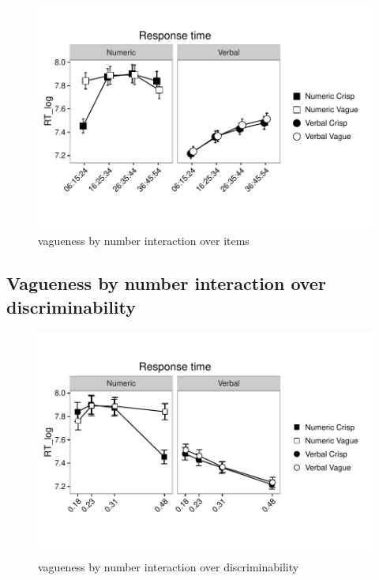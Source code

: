 \documentclass[a4paper,12pt,twoside]{article}\usepackage[]{graphicx}\usepackage[]{color}
\makeatletter
\def\maxwidth{ %
  \ifdim\Gin@nat@width>\linewidth
    \linewidth
  \else
    \Gin@nat@width
  \fi
}
\newenvironment{knitrout}{}{} %
\makeatother
\begin{document}
\begin{knitrout}\scriptsize
{}\color{fgcolor}\begin{figure}[hbtp]

{\centering \includegraphics[width=\maxwidth]{figure/graphics-plotInt1-1} 

}

\caption[vagueness by number interaction over items]{vagueness by number interaction over items}\label{fig:plotInt1}
\end{figure}


\end{knitrout}

\clearpage
\subsection{Vagueness by number interaction over discriminability}


\begin{knitrout}\scriptsize
{}\color{fgcolor}\begin{figure}[hbtp]

{\centering \includegraphics[width=\maxwidth]{figure/graphics-plotInt2-1} 

}

\caption[vagueness by number interaction over discriminability]{vagueness by number interaction over discriminability}\label{fig:plotInt2}
\end{figure}


\end{knitrout}
\end{document}
